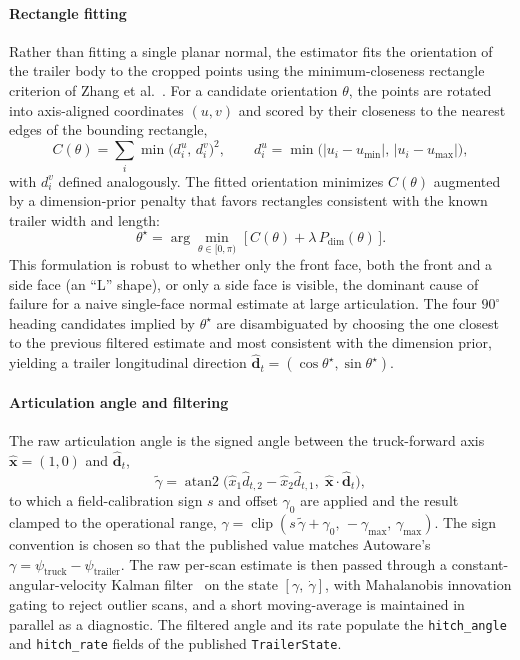 \paragraph{Rectangle fitting} Rather than fitting a single planar normal, the estimator fits the orientation of the trailer body to the cropped points using the minimum-closeness rectangle criterion of Zhang et al.~\cite{zhang2017lshape}. For a candidate orientation $\theta$, the points are rotated into axis-aligned coordinates $(u, v)$ and scored by their closeness to the nearest edges of the bounding rectangle,
\begin{equation}
    C(\theta) = \sum_i \min\!\big(d^u_i,\, d^v_i\big)^2,
    \qquad
    d^u_i = \min\!\big(|u_i - u_\text{min}|,\, |u_i - u_\text{max}|\big),
    \label{eq:hitch_closeness}
\end{equation}
with $d^v_i$ defined analogously. The fitted orientation minimizes $C(\theta)$ augmented by a dimension-prior penalty that favors rectangles consistent with the known trailer width and length:
\begin{equation}
    \theta^\star = \arg\min_{\theta \in [0, \pi)} \;\big[\, C(\theta) + \lambda\, P_\text{dim}(\theta) \,\big].
    \label{eq:hitch_fit}
\end{equation}
This formulation is robust to whether only the front face, both the front and a side face (an ``L'' shape), or only a side face is visible, the dominant cause of failure for a naive single-face normal estimate at large articulation. The four $90^\circ$ heading candidates implied by $\theta^\star$ are disambiguated by choosing the one closest to the previous filtered estimate and most consistent with the dimension prior, yielding a trailer longitudinal direction $\hat{\mathbf{d}}_t = (\cos\theta^\star, \sin\theta^\star)$.

\paragraph{Articulation angle and filtering} The raw articulation angle is the signed angle between the truck-forward axis $\hat{\mathbf{x}} = (1, 0)$ and $\hat{\mathbf{d}}_t$,
\begin{equation}
    \tilde\gamma = \operatorname{atan2}\!\big(\hat{x}_1 \hat{d}_{t,2} - \hat{x}_2 \hat{d}_{t,1},\; \hat{\mathbf{x}} \cdot \hat{\mathbf{d}}_t\big),
    \label{eq:hitch_raw_angle}
\end{equation}
to which a field-calibration sign $s$ and offset $\gamma_0$ are applied and the result clamped to the operational range, $\gamma = \operatorname{clip}(s\,\tilde\gamma + \gamma_0,\, -\gamma_\text{max},\, \gamma_\text{max})$. The sign convention is chosen so that the published value matches Autoware's $\gamma = \psi_\text{truck} - \psi_\text{trailer}$. The raw per-scan estimate is then passed through a constant-angular-velocity Kalman filter~\cite{kalman1960new} on the state $[\gamma,\ \dot\gamma]$, with Mahalanobis innovation gating to reject outlier scans, and a short moving-average is maintained in parallel as a diagnostic. The filtered angle and its rate populate the \texttt{hitch\_angle} and \texttt{hitch\_rate} fields of the published \texttt{TrailerState}.

